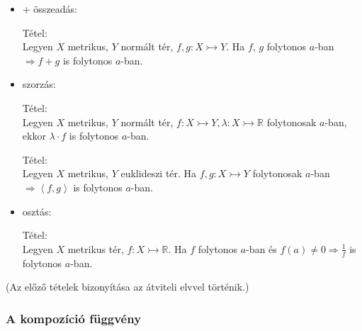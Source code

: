 \documentclass[12pt,a4paper]{scrartcl}
\providecommand{\tightlist}{%
  \setlength{\itemsep}{0pt}\setlength{\parskip}{0pt}}
\newenvironment{tetel}{}{}
\begin{document}
\begin{itemize}
\tightlist
\item
  + összeadás:

  \begin{tetel}

  Tétel:\\
  Legyen \(X\) metrikus, \(Y\) normált tér,
  \(\left. f,g:X\rightarrowtail Y \right.\). Ha \(f\), \(g\) folytonos
  \(a\)-ban \(\left. \Rightarrow f + g \right.\) is folytonos \(a\)-ban.

  \end{tetel}
\item
  szorzás:

  \begin{tetel}

  Tétel:\\
  Legyen \(X\) metrikus, \(Y\) normált tér,
  \(\left. f:X\rightarrowtail Y,\lambda:X\rightarrowtail{\mathbb{R}} \right.\)
  folytonosak \(a\)-ban, ekkor \(\lambda \cdot f\) is folytonos
  \(a\)-ban.

  \end{tetel}

  \begin{tetel}

  Tétel:\\
  Legyen \(X\) metrikus, \(Y\) euklideszi tér. Ha
  \(\left. f,g:X\rightarrowtail Y \right.\) folytonosak \(a\)-ban
  \(\left. \Rightarrow\left\langle {f,g} \right\rangle \right.\) is
  folytonos \(a\)-ban.

  \end{tetel}
\end{itemize}

\begin{itemize}
\tightlist
\item
  osztás:

  \begin{tetel}

  Tétel:\\
  Legyen \(X\) metrikus tér,
  \(\left. f:X\rightarrowtail{\mathbb{R}} \right.\). Ha \(f\) folytonos
  \(a\)-ban és
  \(\left. f\left( a \right) \neq 0\Rightarrow\frac{1}{f} \right.\) is
  folytonos \(a\)-ban.

  \end{tetel}
\end{itemize}

(Az előző tételek bizonyítása az átviteli elvvel történik.)

\hypertarget{a-kompozicio-fuggveny}{%
\subsubsection{A kompozíció függvény}\label{a-kompozicio-fuggveny}}
\end{document}
